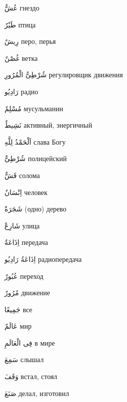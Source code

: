 \documentclass[a5paper]{article}
\newcommand\textstyleDropCaps[1]{#1}
\newcommand\textstyleCaptioncharacters[1]{#1}
\begin{document}
\textstyleCaptioncharacters{عُشٌّ }\textstyleDropCaps{гнездо‎}

\textstyleCaptioncharacters{طَيْرٌ }\textstyleDropCaps{птица‎}

\textstyleCaptioncharacters{رِيشٌ }\textstyleDropCaps{перо, перья‎}

\textstyleCaptioncharacters{غُصْنٌ }\textstyleDropCaps{ветка‎}

\textstyleCaptioncharacters{شُرْطِىُّ الْمُرُورِ }\textstyleDropCaps{регули­ровщик движения‎}

\textstyleCaptioncharacters{رَادِيُو }\textstyleDropCaps{радио‎}

\textstyleCaptioncharacters{مُسْلِمٌ }\textstyleDropCaps{мусульманин‎}

\textstyleCaptioncharacters{نَشِيطٌ }\textstyleDropCaps{активный, энергичн­ый‎}

\textstyleCaptioncharacters{اَلْحَمْدُ لِلَّهِ }\textstyleDropCaps{слава Богу‎}

\textstyleCaptioncharacters{شُرْطِىٌّ }\textstyleDropCaps{полицейский‎}

\textstyleCaptioncharacters{قَشٌّ }\textstyleDropCaps{солома‎}

\textstyleCaptioncharacters{اِنْسَانٌ }\textstyleDropCaps{человек‎}

\textstyleCaptioncharacters{شَجَرَةٌ }\textstyleDropCaps{(одно) дерево‎}

\textstyleCaptioncharacters{شَارِعٌ }\textstyleDropCaps{улица‎}

\textstyleCaptioncharacters{اِذَاعَةٌ }\textstyleDropCaps{передача‎}

\textstyleCaptioncharacters{اِذَاعَةُ رَادِيُو }\textstyleDropCaps{радиопере­дача‎}

\textstyleCaptioncharacters{عُبُورٌ }\textstyleDropCaps{переход‎}

\textstyleCaptioncharacters{مُرُورٌ }\textstyleDropCaps{движение‎}

\textstyleCaptioncharacters{جَمِيعًا }\textstyleDropCaps{все‎}

\textstyleCaptioncharacters{عَالَمٌ }\textstyleDropCaps{мир‎}

\textstyleCaptioncharacters{فِى الْعَالَمِ }\textstyleDropCaps{в мире‎}

\textstyleCaptioncharacters{سَمِعَ }\textstyleDropCaps{слышал‎}

\textstyleCaptioncharacters{وَقَفَ }\textstyleDropCaps{встал, стоял‎}

\textstyleCaptioncharacters{صَنَعَ }\textstyleDropCaps{делал, изготовил‎}
\end{document}
